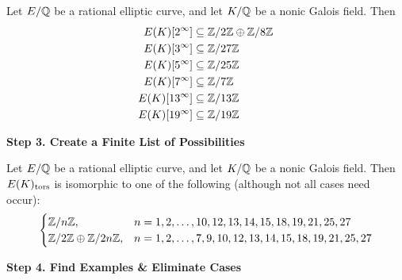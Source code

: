\begin{frame}[plain]
\footnotesize
\begin{lem}
Let $E/\mathbb{Q}$ be a rational elliptic curve, and let $K/\mathbb{Q}$ be a nonic Galois field. Then
	\[
	\begin{aligned}
	E(K)[2^\infty]&\subseteq \mathbb{Z}/2\mathbb{Z} \oplus \mathbb{Z}/8\mathbb{Z} \\
	E(K)[3^\infty]&\subseteq \mathbb{Z}/27\mathbb{Z} \\
	E(K)[5^\infty]&\subseteq \mathbb{Z}/25\mathbb{Z} \\
	E(K)[7^\infty]&\subseteq \mathbb{Z}/7\mathbb{Z} \\
	E(K)[13^\infty]&\subseteq \mathbb{Z}/13\mathbb{Z} \\
	E(K)[19^\infty]&\subseteq \mathbb{Z}/19\mathbb{Z}
	\end{aligned}
	\]
\end{lem}
\end{frame}



\begin{frame}[plain]
\vfill
\begin{center} {\bfseries \Large \textcolor{SwarthGarnet}{Step 3. Create a Finite List of Possibilities}} \end{center}
\vfill 
\end{frame}



\begin{frame}[plain]
\footnotesize
\begin{lem}
Let $E/\mathbb{Q}$ be a rational elliptic curve, and let $K/\mathbb{Q}$ be a nonic Galois field. Then $E(K)_{\text{tors}}$ is isomorphic to one of the following (although not all cases need occur):
	\[
	\begin{cases}
	\mathbb{Z}/n\mathbb{Z}, & n= 1, 2, \ldots, 10, 12, 13, 14, 15, 18, 19, 21, 25, 27 \\
	\mathbb{Z}/2\mathbb{Z} \oplus \mathbb{Z}/2n\mathbb{Z}, & n= 1, 2, \ldots, 7, 9, 10, 12, 13, 14, 15, 18, 19, 21, 25, 27
	\end{cases}
	\]
\end{lem} 
\end{frame}



\begin{frame}[plain]
\vfill
\begin{center} {\bfseries \Large \textcolor{SwarthGarnet}{Step 4. Find Examples \& Eliminate Cases}} \end{center}
\vfill 
\end{frame}



